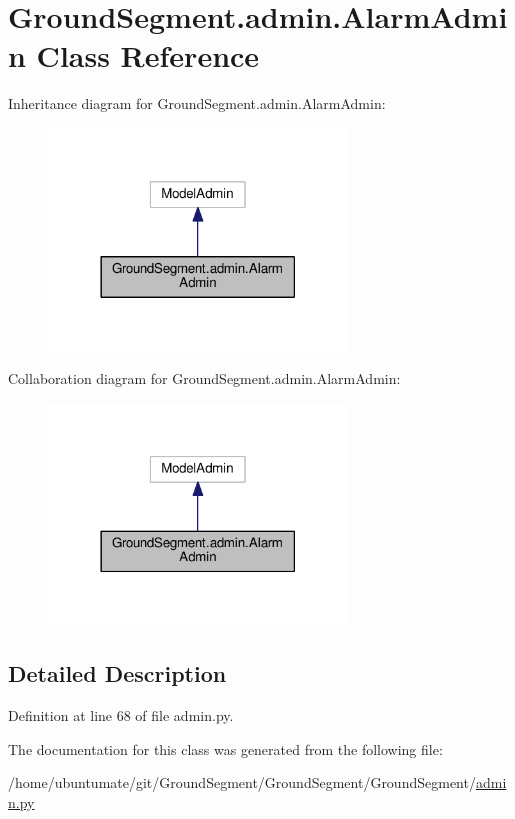 \hypertarget{class_ground_segment_1_1admin_1_1_alarm_admin}{}\section{Ground\+Segment.\+admin.\+Alarm\+Admin Class Reference}
\label{class_ground_segment_1_1admin_1_1_alarm_admin}


Inheritance diagram for Ground\+Segment.\+admin.\+Alarm\+Admin\+:\nopagebreak
\begin{figure}[H]
\begin{center}
\leavevmode
\includegraphics[width=225pt]{class_ground_segment_1_1admin_1_1_alarm_admin__inherit__graph}
\end{center}
\end{figure}


Collaboration diagram for Ground\+Segment.\+admin.\+Alarm\+Admin\+:\nopagebreak
\begin{figure}[H]
\begin{center}
\leavevmode
\includegraphics[width=225pt]{class_ground_segment_1_1admin_1_1_alarm_admin__coll__graph}
\end{center}
\end{figure}


\subsection{Detailed Description}


Definition at line 68 of file admin.\+py.



The documentation for this class was generated from the following file\+:\begin{DoxyCompactItemize}
\item 
/home/ubuntumate/git/\+Ground\+Segment/\+Ground\+Segment/\+Ground\+Segment/\hyperlink{admin_8py}{admin.\+py}\end{DoxyCompactItemize}
